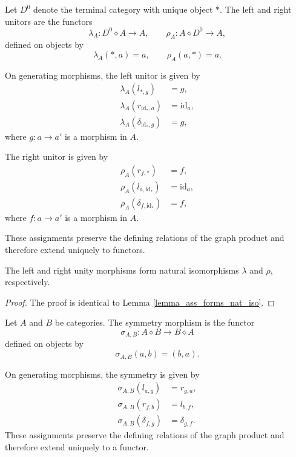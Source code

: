 \documentclass{tac}
\begin{document}
\begin{definition}
Let $D^0$ denote the terminal category with unique object $*$. The
left and right unitors are the functors
\[
\lambda_A:D^0\diamond A\longrightarrow A,
\qquad
\rho_A:A\diamond D^0\longrightarrow A,
\]
defined on objects by
\[
\lambda_A(*,a)=a,
\qquad
\rho_A(a,*)=a.
\]

On generating morphisms, the left unitor is given by
\begin{align*}
\lambda_A(l_{*,g})&=g,\\
\lambda_A(r_{\mathrm{id}_*,a})&=\mathrm{id}_a,\\
\lambda_A(\delta_{\mathrm{id}_*,g})&=g,
\end{align*}
where $g:a\to a'$ is a morphism in $A$.

The right unitor is given by
\begin{align*}
\rho_A(r_{f,*})&=f,\\
\rho_A(l_{a,\mathrm{id}_*})&=\mathrm{id}_a,\\
\rho_A(\delta_{f,\mathrm{id}_*})&=f,
\end{align*}
where $f:a\to a'$ is a morphism in $A$.

These assignments preserve the defining relations of the graph product and
therefore extend uniquely to functors.
\end{definition}

\begin{lemma}
The left and right unity morphisms form natural isomorphisms $\lambda$ and $\rho$, respectively.
\end{lemma}

\begin{proof}
The proof is identical to Lemma \ref{lemma_ass_forms_nat_iso}.
\end{proof}

\begin{definition}
Let $A$ and $B$ be categories. The symmetry morphism is the functor
\[
\sigma_{A,B}:A\diamond B\longrightarrow B\diamond A
\]
defined on objects by
\[
\sigma_{A,B}(a,b)=(b,a).
\]

On generating morphisms, the symmetry is given by
\begin{align*}
\sigma_{A,B}(l_{a,g})
&=r_{g,a},\\
\sigma_{A,B}(r_{f,b})
&=l_{b,f},\\
\sigma_{A,B}(\delta_{f,g})
&=\delta_{g,f}.
\end{align*}
These assignments preserve the defining relations of the graph product and
therefore extend uniquely to a functor.
\end{definition}
\end{document}
